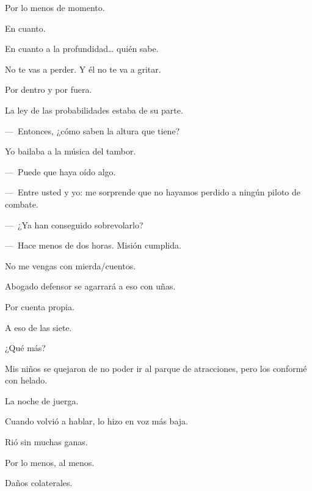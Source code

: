 \sk
Por lo menos de momento. 

\sk
En cuanto. 

\sk
En cuanto a la profundidad\ldots{} quién sabe. 

\sk
No te vas a perder. Y él no te va a gritar. 

\sk
Por dentro y por fuera. 

\sk
La ley de las probabilidades estaba de su parte. 


\sk
---~Entonces, ¿cómo saben la altura que tiene? 

\sk
Yo bailaba a la música del tambor. 

\sk
---~Puede que haya oído algo. 

\sk
---~Entre usted y yo: me sorprende que no hayamos perdido a ningún piloto de combate. 

\sk
---~¿Ya han conseguido sobrevolarlo? 

---~Hace menos de dos horas. Misión cumplida. 

\sk
No me vengas con mierda/cuentos. 

\sk
Abogado defensor se agarrará a eso con uñas. 

\sk
Por cuenta propia. 

\sk
A eso de las siete. 

\sk
¿Qué más? 

\sk
Mis niños se quejaron de no poder ir al parque de atracciones, pero los conformé con helado. 

\sk
La noche de juerga. 

\sk
Cuando volvió a hablar, lo hizo en voz más baja.

\sk
Rió sin muchas ganas.

\sk
Por lo menos, al menos. 

\sk
Daños colaterales. 

